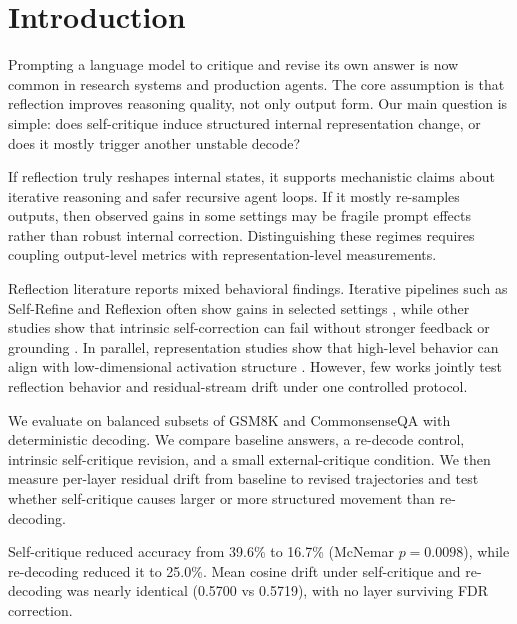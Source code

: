 \section{Introduction}
\label{sec:introduction}
Prompting a language model to critique and revise its own answer is now common in research systems and production agents. The core assumption is that reflection improves reasoning quality, not only output form. Our main question is simple: does self-critique induce structured internal representation change, or does it mostly trigger another unstable decode?

 If reflection truly reshapes internal states, it supports mechanistic claims about iterative reasoning and safer recursive agent loops. If it mostly re-samples outputs, then observed gains in some settings may be fragile prompt effects rather than robust internal correction. Distinguishing these regimes requires coupling output-level metrics with representation-level measurements.

 Reflection literature reports mixed behavioral findings. Iterative pipelines such as Self-Refine and Reflexion often show gains in selected settings \citep{madaan2023selfrefine,shinn2023reflexion}, while other studies show that intrinsic self-correction can fail without stronger feedback or grounding \citep{huang2023llmscannot,gou2024critic,chen2024errorlocation}. In parallel, representation studies show that high-level behavior can align with low-dimensional activation structure \citep{zou2023representation,turner2023steering,zhao2024residual,arditi2024refusal}. However, few works jointly test reflection behavior and residual-stream drift under one controlled protocol.

 We evaluate \qwen on balanced subsets of GSM8K and CommonsenseQA with deterministic decoding. We compare baseline answers, a re-decode control, intrinsic self-critique revision, and a small external-critique condition. We then measure per-layer residual drift from baseline to revised trajectories and test whether self-critique causes larger or more structured movement than re-decoding.

 Self-critique reduced accuracy from 39.6\% to 16.7\% (McNemar $p=0.0098$), while re-decoding reduced it to 25.0\%. Mean cosine drift under self-critique and re-decoding was nearly identical (0.5700 vs 0.5719), with no layer surviving FDR correction.

